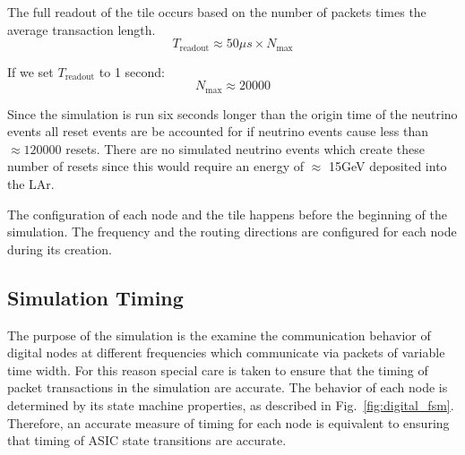 The full readout of the tile occurs based on the number of packets times the average transaction length.
\begin{equation}
T_{\mathrm{readout}} \approx 50 \mu s \times N_{\mathrm{max}}
\end{equation}

If we set $T_{\mathrm{readout}}$ to 1 second:
\begin{equation}
N_{\mathrm{max}} \approx 20000
\end{equation}

Since the simulation is run six seconds longer than the origin time of the neutrino events all reset events are be accounted for if neutrino events cause less than $\approx 120000$ resets.
There are no simulated neutrino events which create these number of resets since this would require an energy of $\approx$ 15\unit{GeV} deposited into the LAr.

The configuration of each node and the tile happens before the beginning of the simulation.
The frequency and the routing directions are configured for each node during its creation.

\subsection{Simulation Timing}

The purpose of the simulation is the examine the communication behavior of digital nodes at different frequencies which communicate via packets of variable time width.
For this reason special care is taken to ensure that the timing of packet transactions in the simulation are accurate.
The behavior of each node is determined by its state machine properties, as described in Fig.~\ref{fig:digital_fsm}.
Therefore, an accurate measure of timing for each node is equivalent to ensuring that timing of ASIC state transitions are accurate.

